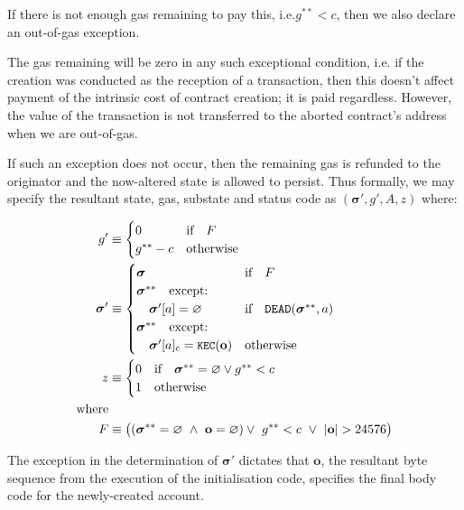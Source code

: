 \documentclass[9pt,oneside]{amsart}
\makeatletter
\newcommand*\ie{i.e.\@\xspace}
\makeatother
\begin{document}
\begin{multicols}{2}
If there is not enough gas remaining to pay this, \ie $g^{**} < c$, then we also declare an out-of-gas exception.

The gas remaining will be zero in any such exceptional condition, \ie if the creation was conducted as the reception of a transaction, then this doesn't affect payment of the intrinsic cost of contract creation; it is paid regardless. However, the value of the transaction is not transferred to the aborted contract's address when we are out-of-gas.

If such an exception does not occur, then the remaining gas is refunded to the originator and the now-altered state is allowed to persist. Thus formally, we may specify the resultant state, gas, substate and status code as $(\boldsymbol{\sigma}', g', A, z)$ where:

\begin{align}
\quad g' &\equiv \begin{cases}
0 & \text{if} \quad F \\
g^{**} - c & \text{otherwise} \\
\end{cases} \\
\quad \boldsymbol{\sigma}' &\equiv  \begin{cases}
\boldsymbol{\sigma} & \text{if} \quad F \\
\boldsymbol{\sigma}^{**} \quad \text{except:} & \\
\quad\boldsymbol{\sigma}'[a] = \varnothing & \text{if} \quad \mathtt{\tiny DEAD}(\boldsymbol{\sigma}^{**}, a) \\
\boldsymbol{\sigma}^{**} \quad \text{except:} & \\
\quad\boldsymbol{\sigma}'[a]_{\mathrm{c}} = \texttt{\small KEC}(\mathbf{o}) & \text{otherwise}
\end{cases} \\
\quad z &\equiv \begin{cases}
0 & \text{if} \quad \boldsymbol{\sigma}^{**} = \varnothing \lor g^{**} < c \\
1 & \text{otherwise}
\end{cases} \\
\nonumber \text{where} \\
F &\equiv \big((\boldsymbol{\sigma}^{**} = \varnothing \ \wedge\ \mathbf{o} = \varnothing) \vee\  g^{**} < c \ \vee\  |\mathbf{o}| > 24576\big)
\end{align}

The exception in the determination of $\boldsymbol{\sigma}'$ dictates that $\mathbf{o}$, the resultant byte sequence from the execution of the initialisation code, specifies the final body code for the newly-created account.


\end{multicols}
\end{document}
